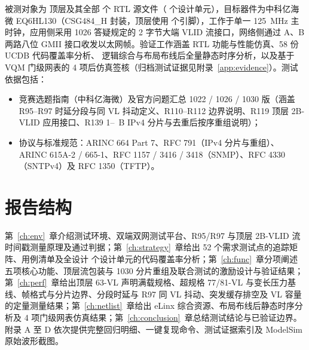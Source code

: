 被测对象为  顶层及其全部 \RtlFileCount{} 个 RTL 源文件（\DesignUnitCount{} 个设计单元），目标器件为中科亿海微 EQ6HL130（CSG484\_H 封装，顶层使用 \Pins{} 个引脚），工作于单一 125~MHz 主时钟，应用侧采用 1026 答疑规定的 2 字节大端 VLID 流接口，网络侧通过 A、B 两路八位 GMII 接口收发以太网帧。验证工作涵盖 RTL 功能与性能仿真、58 份 UCDB 代码覆盖率分析、 逻辑综合与布局布线后全量静态时序分析，以及基于 VQM 门级网表的 4 项后仿真签核（归档测试证据见附录~\ref{app:evidence}）。测试依据包括：
\begin{itemize}
  \item 竞赛选题指南（中科亿海微）及官方问题汇总 1022 / 1026 / 1030 版（涵盖 R95--R97 时延分段与同 VL 抖动定义、R110--R112 边界说明、R119 顶层 2B-VLID 应用接口、R139 1--\MaxMessageBytes{}~B IPv4 分片与去重后按序重组说明）；
  \item 协议与标准规范：ARINC 664 Part 7、RFC 791（IPv4 分片与重组）、ARINC 615A-2 / 665-1、RFC 1157 / 3416 / 3418（SNMP）、RFC 4330（SNTPv4）及 RFC 1350（TFTP）。
\end{itemize}

\section{报告结构}

第~\ref{ch:env}~章介绍测试环境、双端双网测试平台、R95/R97 与顶层 2B-VLID 流时间戳测量原理及通过判据；第~\ref{ch:strategy}~章给出 52 个需求测试点的追踪矩阵、用例清单及全设计 \DesignUnitCount{} 个设计单元的代码覆盖率分析；第~\ref{ch:func}~章分项阐述五项核心功能、顶层流包装与 1030 分片重组及联合测试的激励设计与验证结果；第~\ref{ch:perf}~章给出顶层 63-VL 声明满载规格、超规格 77/81-VL 与变长压力基线、帧格式与分片边界、分段时延与 R97 同 VL 抖动、突发缓存排空及 VL 容量的定量测量结果；第~\ref{ch:netlist}~章给出 eLinx 综合资源、布局布线后静态时序分析及 4 项门级网表仿真结果；第~\ref{ch:conclusion}~章总结测试结论与已验证边界。附录 A 至 D 依次提供完整回归明细、一键复现命令、测试证据索引及 ModelSim 原始波形截图。
